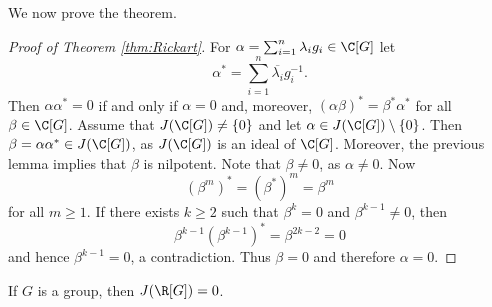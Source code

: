 We now prove the theorem. 

\begin{proof}[Proof of Theorem \ref{thm:Rickart}]
    For $\alpha=\sum_{i=1}^n\lambda_ig_i\in\C[G]$ let 
    \[
    \alpha^*=\sum_{i=1}^n\overline{\lambda_i}g_i^{-1}.
    \]
    Then $\alpha\alpha^*=0$ if and only if $\alpha=0$ and, moreover, 
    $(\alpha\beta)^*=\beta^*\alpha^*$ for all $\beta\in\C[G]$. 
    Assume that $J(\C[G])\ne\{0\}$ and let $\alpha\in J(\C[G])\setminus\{0\}$. Then
    $\beta=\alpha\alpha^*\in J(\C[G])$, as $J(\C[G])$ is an ideal of $\C[G]$. Moreover, the previous 
    lemma implies that $\beta$ is nilpotent. Note that $\beta\ne 0$, as $\alpha\ne0$. Now  
    \[
    (\beta^m)^*=(\beta^*)^m=\beta^m
    \]
    for all $m\geq1$. If there exists $k\geq2$ such that $\beta^k=0$ and $\beta^{k-1}\ne 0$, then
    \[
    \beta^{k-1}\left(\beta^{k-1}\right)^*=\beta^{2k-2}=0
    \]
    and hence $\beta^{k-1}=0$, a contradiction. Thus $\beta=0$ and therefore $\alpha=0$. 
\end{proof}

\begin{exercise}
	If $G$ is a group, then $J(\R[G])=0$. 
\end{exercise}





